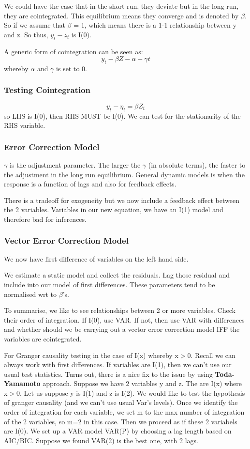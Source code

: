 \documentclass[11pt, oneside]{article}
\theoremstyle{definition}
\begin{document}
We could have the case that in the short run, they deviate but in the long run, they are cointegrated. This equilibrium means they converge and is denoted by $\beta$. So if we assume that $\beta$ = 1, which means there is a 1-1 relationship between y and z. So thus, $y_t - z_t$ is I(0).

A generic form of cointegration can be seen as:
$$
y_t - \beta Z - \alpha - \gamma t
$$
whereby $\alpha$ and $\gamma$ is set to 0.

\subsubsection{Testing Cointegration}
$$
y_t - \eta_t = \beta Z_t
$$
so LHS is I(0), then RHS MUST be I(0). We can test for the stationarity of the RHS variable.

\subsubsection{Error Correction Model}

$\gamma$ is the adjustment parameter. The larger the $\gamma$ (in absolute terms), the faster to the adjustment in the long run equilibrium. General dynamic models is when the response is a function of lags and also for feedback effects.

There is a tradeoff for exogeneity but we now include a feedback effect between the 2 variables. Variables in our new equation, we have an I(1) model and therefore bad for inferences.

\subsubsection{Vector Error Correction Model}
We now have first difference of variables on the left hand side.

We estimate a static model and collect the residuals. Lag those residual and include into our model of first differences. These parameters tend to be normalised wrt to $\beta$'s.

To summarise, we like to see relationships between 2 or more variables. Check their order of integration. If I(0), use VAR. If not, then use VAR with differences and whether should we be carrying out a vector error correction model IFF the variables are cointegrated.

For Granger causality testing in the case of I(x) whereby x$>$0. Recall we can always work with first differences. If variables are I(1), then we can't use our usual test statistics. Turns out, there is a nice fix to the issue by using \textbf{Toda-Yamamoto} approach. Suppose we have 2 variables y and z. The are I(x) where x$>$0. Let us suppose y is I(1) and z is I(2). We would like to test the hypothesis of granger causality (and we can't use usual Var's levels). Once we identify the order of integration for each variable, we set m to the max number of integration of the 2 variables, so m=2 in this case. Then we proceed as if these 2 variabels are I(0). We set up a VAR model VAR(P) by choosing a lag length based on AIC/BIC. Suppose we found VAR(2) is the best one, with 2 lags.
\end{document}
